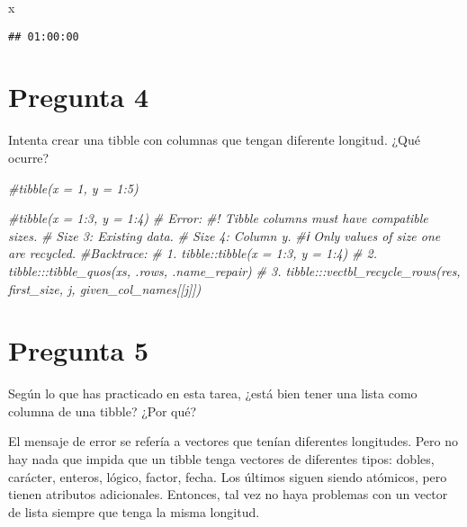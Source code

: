\documentclass[
]{article}
\newenvironment{Shaded}{\begin{snugshade}}{\end{snugshade}}
\newcommand{\CommentTok}[1]{\textcolor[rgb]{0.56,0.35,0.01}{\textit{#1}}}
\newcommand{\NormalTok}[1]{#1}
\begin{document}
\begin{Shaded}
\begin{Highlighting}[]
\NormalTok{x}
\end{Highlighting}
\end{Shaded}

\begin{verbatim}
## 01:00:00
\end{verbatim}

\hypertarget{pregunta-4}{%
\section{Pregunta 4}\label{pregunta-4}}

Intenta crear una tibble con columnas que tengan diferente longitud.
¿Qué ocurre?

\begin{Shaded}
\begin{Highlighting}[]
\CommentTok{\#tibble(x = 1, y = 1:5)}
\end{Highlighting}
\end{Shaded}

\begin{Shaded}
\begin{Highlighting}[]
\CommentTok{\#tibble(x = 1:3, y = 1:4)}
\CommentTok{\# Error:}
\CommentTok{\#! Tibble columns must have compatible sizes.}
\CommentTok{\# Size 3: Existing data.}
\CommentTok{\# Size 4: Column \textasciigrave{}y\textasciigrave{}.}
\CommentTok{\#ℹ Only values of size one are recycled.}
\CommentTok{\#Backtrace:}
\CommentTok{\# 1. tibble::tibble(x = 1:3, y = 1:4)}
\CommentTok{\# 2. tibble:::tibble\_quos(xs, .rows, .name\_repair)}
\CommentTok{\# 3. tibble:::vectbl\_recycle\_rows(res, first\_size, j, given\_col\_names[[j]])}
\end{Highlighting}
\end{Shaded}

\hypertarget{pregunta-5}{%
\section{Pregunta 5}\label{pregunta-5}}

Según lo que has practicado en esta tarea, ¿está bien tener una lista
como columna de una tibble? ¿Por qué?

El mensaje de error se refería a vectores que tenían diferentes
longitudes. Pero no hay nada que impida que un tibble tenga vectores de
diferentes tipos: dobles, carácter, enteros, lógico, factor, fecha. Los
últimos siguen siendo atómicos, pero tienen atributos adicionales.
Entonces, tal vez no haya problemas con un vector de lista siempre que
tenga la misma longitud.
\end{document}
